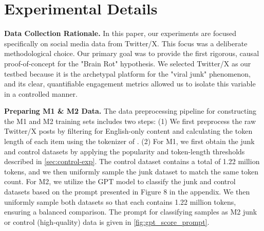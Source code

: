 \section{Experimental Details}
\label{app:exp_details}



\textbf{Data Collection Rationale.}
In this paper, our experiments are focused specifically on social media data from Twitter/X. This focus was a deliberate methodological choice. Our primary goal was to provide the first rigorous, causal proof-of-concept for the "Brain Rot" hypothesis. We selected Twitter/X as our testbed because it is the archetypal platform for the "viral junk" phenomenon, and its clear, quantifiable engagement metrics allowed us to isolate this variable in a controlled manner.

\textbf{Preparing M1 \& M2 Data.}
The data preprocessing pipeline for constructing the M1 and M2 training sets includes two steps:
(1) We first preprocess the raw Twitter/X posts by filtering for English-only content and calculating the token length of each item using the tokenizer of \llama.
(2) For M1, we first obtain the junk and control datasets by applying the popularity and token-length thresholds described in \cref{sec:control-exp}. The control dataset contains a total of 1.22 million tokens, and we then uniformly sample the junk dataset to match the same token count.
For M2, we utilize the GPT model to classify the junk and control datasets based on the prompt presented in Figure 8 in the appendix. We then uniformly sample both datasets so that each contains 1.22 million tokens, ensuring a balanced comparison.
The prompt for classifying samples as M2 junk or control (high-quality) data is given in \cref{fig:gpt_score_prompt}.


